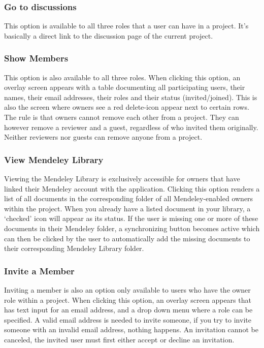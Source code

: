 \subsubsection{Go to discussions}

This option is available to all three roles that a user can have in a project. It's basically a direct link to the discussion page of the current project.

\subsubsection{Show Members}

This option is also available to all three roles. When clicking this option, an overlay screen appears with a table documenting all participating users, their names, their email addresses, their roles and their status (invited/joined). This is also the screen where owners see a red delete-icon appear next to certain rows. The rule is that owners cannot remove each other from a project. They can however remove a reviewer and a guest, regardless of who invited them originally. Neither reviewers nor guests can remove anyone from a project.

\subsubsection{View Mendeley Library}

Viewing the Mendeley Library is exclusively accessible for owners that have linked their Mendeley account with the application. Clicking this option renders a list of all documents in the corresponding folder of all Mendeley-enabled owners within the project. When you already have a listed document in your library, a `checked' icon will appear as its status. If the user is missing one or more of these documents in their Mendeley folder, a synchronizing button becomes active which can then be clicked by the user to automatically add the missing documents to their corresponding Mendeley Library folder.

\subsubsection{Invite a Member}

Inviting a member is also an option only available to users who have the owner role within a project. When clicking this option, an overlay screen appears that has text input for an email address, and a drop down menu where a role can be specified. A valid email address is needed to invite someone, if you try to invite someone with an invalid email address, nothing happens. An invitation cannot be canceled, the invited user must first either accept or decline an invitation.

